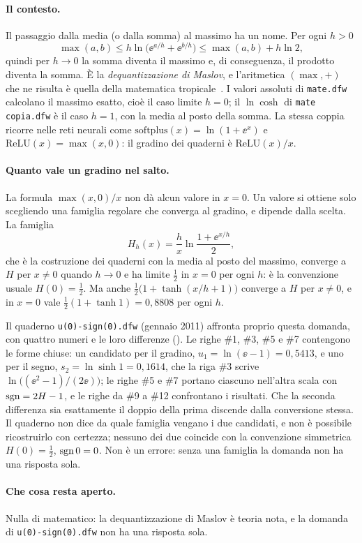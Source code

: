 \paragraph{Il contesto.}
Il passaggio dalla media (o dalla somma) al massimo ha un nome. Per ogni
$h>0$
\[
  \max(a,b)\le h\ln\bigl(\ee^{a/h}+\ee^{b/h}\bigr)\le\max(a,b)+h\ln2 ,
\]
quindi per $h\to0$ la somma diventa il massimo e, di conseguenza, il prodotto
diventa la somma. \`E la \emph{dequantizzazione di Maslov}, e l'aritmetica
$(\max,+)$ che ne risulta \`e quella della matematica
tropicale~\cite{litvinov2007}. I valori assoluti di \texttt{mate.dfw}
calcolano il massimo esatto, cio\`e il caso limite $h=0$; il $\ln\cosh$ di
\texttt{mate copia.dfw} \`e il caso $h=1$, con la media al posto della somma.
La stessa coppia ricorre nelle reti neurali come
$\mathrm{softplus}(x)=\ln(1+\ee^{x})$ e $\mathrm{ReLU}(x)=\max(x,0)$: il
gradino dei quaderni \`e $\mathrm{ReLU}(x)/x$.

\paragraph{Quanto vale un gradino nel salto.}
La formula $\max(x,0)/x$ non d\`a alcun valore in $x=0$. Un valore si ottiene
solo scegliendo una famiglia regolare che converga al gradino, e dipende
dalla scelta. La famiglia
\[
  H_h(x)=\frac{h}{x}\ln\frac{1+\ee^{x/h}}{2},
\]
che \`e la costruzione dei quaderni con la media al posto del massimo,
converge a $H$ per $x\neq0$ quando $h\to0$ e ha limite $\tfrac12$ in $x=0$
per ogni $h$: \`e la convenzione usuale $H(0)=\tfrac12$. Ma anche
$\frac12\bigl(1+\tanh(x/h+1)\bigr)$ converge a $H$ per $x\neq0$, e in $x=0$
vale $\frac12(1+\tanh1)=0{,}8808$ per ogni $h$.

Il quaderno \texttt{u(0)-sign(0).dfw} (gennaio 2011) affronta proprio questa
domanda, con quattro numeri e le loro differenze
(). Le righe \#1, \#3, \#5 e \#7
contengono le forme chiuse: un candidato per il gradino,
$u_1=\ln(\ee-1)=0{,}5413$, e uno per il segno, $s_2=\ln\sinh1=0{,}1614$, che
la riga \#3 scrive $\ln\bigl((\ee^2-1)/(2\ee)\bigr)$; le righe \#5 e \#7 portano ciascuno
nell'altra scala con $\operatorname{sgn}=2H-1$, e le righe da \#9 a \#12 confrontano i
risultati. Che la seconda differenza sia esattamente il doppio della prima
discende dalla conversione stessa. Il quaderno non dice da quale famiglia
vengano i due candidati, e non \`e possibile ricostruirlo con certezza;
nessuno dei due coincide con la convenzione simmetrica $H(0)=\tfrac12$,
$\operatorname{sgn}0=0$. Non \`e un errore: senza una famiglia la domanda non ha una
risposta sola.

\paragraph{Che cosa resta aperto.}
Nulla di matematico: la dequantizzazione di Maslov \`e teoria nota, e la
domanda di \texttt{u(0)-sign(0).dfw} non ha una risposta sola.
